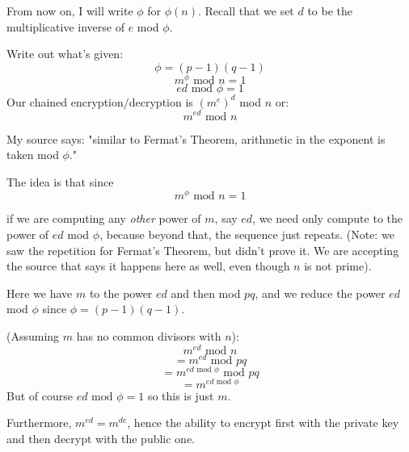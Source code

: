 \documentclass[11pt, oneside]{article}
\begin{document}
From now on, I will write $\phi$ for $\phi(n)$.  Recall that we set $d$ to be the multiplicative inverse of $e$ mod $\phi$. 

Write out what's given:
\[ \phi = (p - 1)(q - 1) \]
\[ m^{\phi} \text{ mod } n = 1 \]
\[ ed  \text{ mod } \phi = 1 \]
Our chained encryption/decryption is $(m^{e})^{d}$ mod $n$  or:
\[ m^{ed} \text{ mod } n \]

My source says:  "similar to Fermat's Theorem, arithmetic in the exponent is taken mod $\phi$."  

The idea is that since  
\[ m^{\phi} \text{ mod } n = 1 \]

if we are computing any \emph{other} power of $m$, say $ed$, we need only compute to the power of $ed$ mod $\phi$, because beyond that, the sequence just repeats.  (Note:  we saw the repetition for Fermat's Theorem, but didn't prove it.  We are accepting the source that says it happens here as well, even though $n$ is not prime).

Here we have $m$  to the power $ed$ and then mod $pq$, and we reduce the power $ed$ mod $\phi$ since $\phi = (p-1)(q-1)$.

(Assuming $m$ has no common divisors with $n$):
\[ m^{ed} \text{ mod } n \]
\[ = m^{ed} \text{ mod } pq \]
\[ = m^{ed \text{ mod } \phi} \text{ mod } pq \]
\[ = m^{ed \text{ mod } \phi} \]
But of course $ed \text{ mod } \phi = 1$ so this is just $m$.

Furthermore, $m^{ed} = m^{de}$, hence the ability to encrypt first with the private key and then decrypt with the public one.
\end{document}
